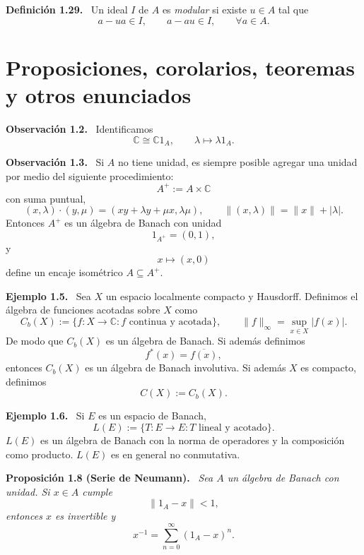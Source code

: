 \documentclass[11pt]{article}
\newenvironment{definicion}[1]
  {\par\medskip\noindent\textbf{Definición #1.}\ }
  {\par\medskip}
\newenvironment{proposicion}[1]
  {\par\medskip\noindent\textbf{Proposición #1.}\ \itshape}
  {\par\medskip}
\newenvironment{observacion}[1]
  {\par\medskip\noindent\textbf{Observación #1.}\ }
  {\par\medskip}
\newenvironment{ejemplo}[1]
  {\par\medskip\noindent\textbf{Ejemplo #1.}\ }
  {\par\medskip}
\begin{document}
\begin{definicion}{1.29}
Un ideal $I$ de $A$ es \emph{modular} si existe $u\in A$ tal que
\[
  a-ua\in I,
  \qquad
  a-au\in I,
  \qquad
  \forall a\in A.
\]
\end{definicion}


\section*{Proposiciones, corolarios, teoremas y otros enunciados}


\begin{observacion}{1.2}
Identificamos
\[
  \mathbb{C}\cong\mathbb{C}1_A,
  \qquad
  \lambda\longmapsto\lambda 1_A.
\]
\end{observacion}

\begin{observacion}{1.3}
Si $A$ no tiene unidad, es siempre posible agregar una unidad por medio del siguiente procedimiento:
\[
  A^+:=A\times\mathbb{C}
\]
con suma puntual,
\[
  (x,\lambda)\cdot(y,\mu)
  =(xy+\lambda y+\mu x,\lambda\mu),
  \qquad
  \lVert(x,\lambda)\rVert=\lVert x\rVert+|\lambda|.
\]
Entonces $A^+$ es un álgebra de Banach con unidad
\[
  1_{A^+}=(0,1),
\]
y
\[
  x\longmapsto(x,0)
\]
define un encaje isométrico $A\subseteq A^+$.
\end{observacion}

\begin{ejemplo}{1.5}
Sea $X$ un espacio localmente compacto y Hausdorff. Definimos el álgebra de funciones acotadas sobre $X$ como
\[
  C_b(X):=\{f:X\to\mathbb{C}: f\text{ continua y acotada}\},
  \qquad
  \lVert f\rVert_\infty=\sup_{x\in X}|f(x)|.
\]
De modo que $C_b(X)$ es un álgebra de Banach. Si además definimos
\[
  f^*(x)=\overline{f(x)},
\]
entonces $C_b(X)$ es un álgebra de Banach involutiva. Si además $X$ es compacto, definimos
\[
  C(X):=C_b(X).
\]
\end{ejemplo}

\begin{ejemplo}{1.6}
Si $E$ es un espacio de Banach,
\[
  L(E):=\{T:E\to E:T\text{ lineal y acotado}\}.
\]
$L(E)$ es un álgebra de Banach con la norma de operadores y la composición como producto. $L(E)$ es en general no conmutativa.
\end{ejemplo}

\begin{proposicion}{1.8 (Serie de Neumann)}
Sea $A$ un álgebra de Banach con unidad. Si $x\in A$ cumple
\[
  \lVert 1_A-x\rVert<1,
\]
entonces $x$ es invertible y
\[
  x^{-1}=\sum_{n=0}^{\infty}(1_A-x)^n.
\]
\end{proposicion}
\end{document}
